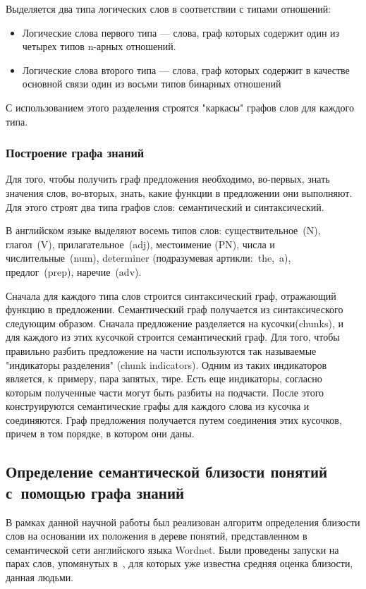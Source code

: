 Выделяется два типа логических слов в соответствии с типами отношений:
\begin{itemize}

\item{
Логические слова первого типа –-- слова, граф которых содержит один из четырех типов n-арных отношений.
}

\item{
Логические слова второго типа –-- слова, граф которых содержит в качестве основной связи один из восьми типов 
бинарных отношений
}
\end {itemize}

С использованием этого разделения строятся "каркасы" графов слов для каждого типа. 


\subsubsection {Построение графа знаний}
Для того, чтобы получить граф предложения необходимо, во-первых,  знать значения слов,
во-вторых, знать, какие функции в предложении они выполняют. Для этого строят два типа графов
слов: семантический и синтаксический.

В английском языке выделяют восемь типов слов: существительное~(N), глагол~(V), прилагательное~(adj),
местоимение (PN),  числа и числительные~(num), determiner (подразумевая артикли:~the,~a), предлог~(prep),
наречие~(adv).

Сначала для каждого типа слов строится синтаксический граф, отражающий функцию в предложении.
Семантический граф получается из синтаксического следующим образом. Сначала предложение
разделяется на кусочки(chunks), и для каждого из этих кусочкой строится семантический граф. Для того,
чтобы правильно разбить предложение на части используются так называемые "индикаторы разделения"
(chunk indicators). Одним из таких индикаторов является, к~примеру, пара запятых, тире. Есть еще 
индикаторы, согласно которым полученные части могут быть разбиты на подчасти.
После этого конструируются семантические графы для каждого слова из кусочка и соединяются.
Граф предложения получается путем соединения этих кусочков, причем в том порядке, в котором
они даны.

\subsection{Определение семантической близости понятий с~помощью графа знаний}
В рамках данной научной работы был реализован алгоритм определения близости слов
на основании их положения в дереве понятий, представленном в семантической сети
английского языка Wordnet\cite{wordnet}.
Были проведены запуски на парах слов, упомянутых в~\cite{complexSim},
для которых уже известна средняя оценка близости, данная людьми.

